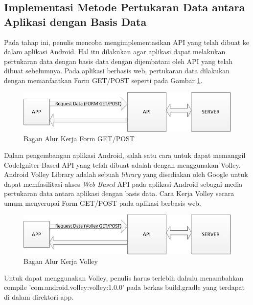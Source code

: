 	\subsection{Implementasi Metode Pertukaran Data antara Aplikasi dengan Basis Data}
		Pada tahap ini, penulis mencoba mengimplementasikan API yang telah dibuat ke dalam aplikasi Android. Hal itu dilakukan agar aplikasi dapat melakukan pertukaran data dengan basis data dengan dijembatani oleh API yang telah dibuat sebelumnya. Pada aplikasi berbasis web, pertukaran data dilakukan dengan memanfaatkan Form GET/POST seperti pada Gambar \ref{req-html}.
		\begin{figure}[H]
			\centering
			\includegraphics[width=1\textwidth]{gambar/new/req_html}
			\caption{Bagan Alur Kerja Form GET/POST}
			\label{req-html}
		\end{figure}
		Dalam pengembangan aplikasi Android, salah satu cara untuk dapat memanggil CodeIgniter-Based API yang telah dibuat adalah dengan menggunakan Volley. Android Volley Library adalah sebuah \textit{library} yang disediakan oleh Google untuk dapat memfasilitasi akses \textit{Web-Based} API pada aplikasi Android sebagai media pertukaran data antara aplikasi dengan basis data. Cara Kerja Volley secara umum menyerupai Form GET/POST pada aplikasi berbasis web.
		\begin{figure}[H]
			\centering
			\includegraphics[width=1\textwidth]{gambar/new/req_volley}
			\caption{Bagan Alur Kerja Volley}
			\label{req-volley}
		\end{figure}
		Untuk dapat menggunakan Volley, penulis harus terlebih dahulu menambahkan compile 'com.android.volley:volley:1.0.0' pada berkas build.gradle yang terdapat di dalam direktori app.    	
